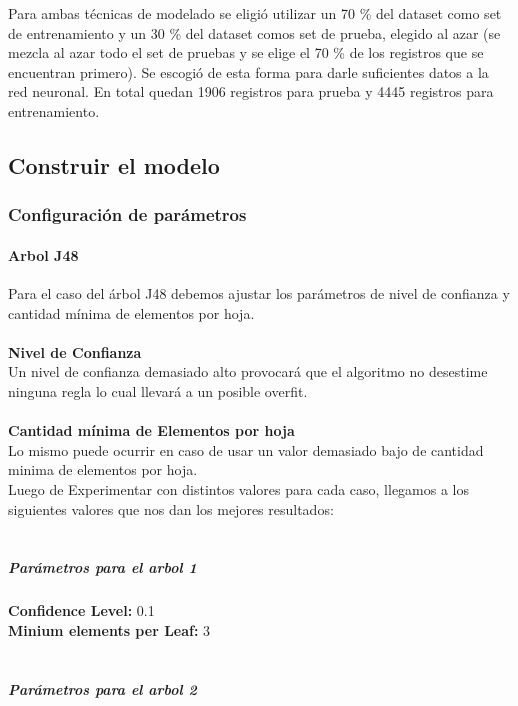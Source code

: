       Para ambas técnicas de modelado se eligió utilizar un 70 \% del dataset
      como set de entrenamiento y un 30 \% del dataset comos set de prueba,
      elegido al azar (se mezcla al azar todo el set de pruebas y se elige el
      70 \% de los registros que se encuentran primero). Se escogió de esta forma
      para darle suficientes datos a la red neuronal. En total quedan 1906
      registros para prueba y 4445 registros para entrenamiento.


\subsection{Construir el modelo}
    \subsubsection{Configuración de parámetros}

      \paragraph{Arbol J48}
          Para el caso del árbol J48 debemos ajustar los parámetros de nivel de
          confianza y cantidad mínima de elementos por hoja.\\\\
          \textbf{Nivel de Confianza\\}
          Un nivel de confianza demasiado alto provocará que el algoritmo no
          desestime ninguna regla lo cual llevará a un posible overfit.\\\\
          \textbf{Cantidad mínima de Elementos por hoja\\}
          Lo mismo puede ocurrir en caso de usar un valor demasiado bajo de
          cantidad minima de elementos por hoja.\\
          Luego de Experimentar con distintos valores para cada caso, llegamos a
          los siguientes valores que nos dan los mejores resultados:\\\\

          \subparagraph{Parámetros para el arbol 1}

              \textbf{Confidence Level:} 0.1\\
              \textbf{Minium elements per Leaf:} 3\\\\

          \subparagraph{Parámetros para el arbol 2}


